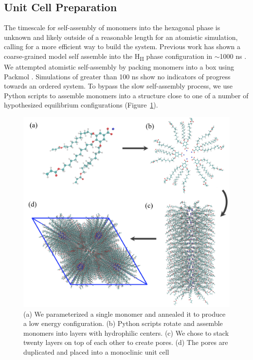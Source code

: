 \documentclass{article}
\begin{document}

  \subsection{Unit Cell Preparation}

  The timescale for self-assembly of monomers into the hexagonal phase is
  unknown and likely outside of a reasonable length for an atomistic simulation,
  calling for a more efficient way to build the system.  Previous work has shown
  a coarse-grained model self assemble into the H\textsubscript{II} phase
  configuration in $\sim$1000 ns \cite{mondal_self-assembly_2013}.  We
  attempted atomistic self-assembly by packing monomers into a box using Packmol
  \cite{martinez_packmol:_2009}.  Simulations of greater than 100 ns show no
  indicators of progress towards an ordered system. To bypass the slow
  self-assembly process, we use Python scripts to assemble monomers into a
  structure close to one of a number of hypothesized equilibrium configurations
  (Figure~\ref{fig:python}).

  \begin{figure}
	\centering
	\includegraphics[width=0.75\linewidth]{build.PNG} %
	\caption{(a) We parameterized a single monomer and annealed it to produce a low energy
		configuration. (b) Python scripts rotate and assemble monomers into layers with 
		hydrophilic centers. (c) We chose to stack twenty layers on top of each other to create
		pores. (d) The pores are duplicated and placed into a monoclinic unit cell}\label{fig:python}
  \end{figure}
  
\end{document}
